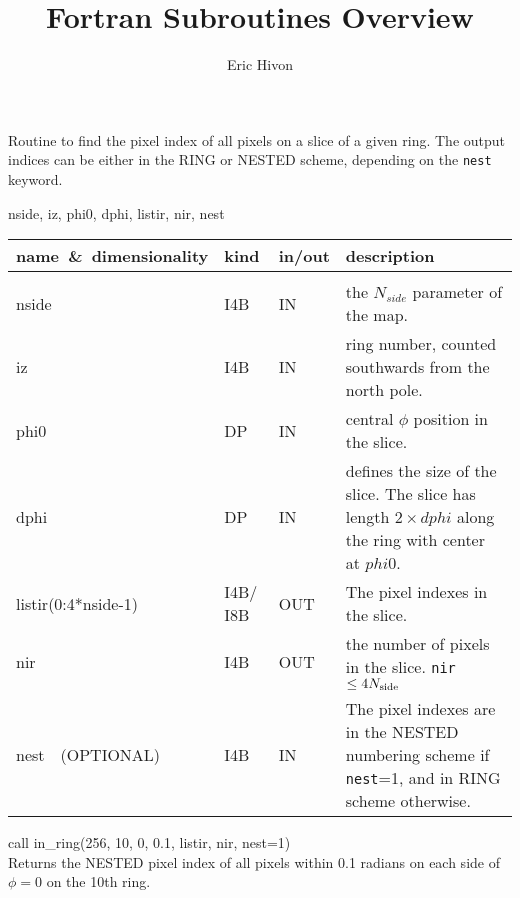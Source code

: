 
\sloppy


\title{\healpix Fortran Subroutines Overview}
 \section[in\_ring]{ }
\label{sub:in_ring}
\author{Eric Hivon}

\begin{facility}
{Routine to find the pixel index of all pixels on a slice of a given
ring. The output indices can be either in the RING or NESTED scheme,
depending on the {\tt nest} keyword.}
{\modPixTools}
\end{facility}

\begin{f90format}
{nside, iz, phi0, dphi, listir, nir, nest}
\end{f90format}

\begin{arguments}
{
\begin{tabular}{p{0.4\hsize} p{0.05\hsize} p{0.1\hsize} p{0.35\hsize}} \hline  
\textbf{name~\&~dimensionality} & \textbf{kind} & \textbf{in/out} & \textbf{description} \\ \hline
                   &   &   &                           \\ %
nside & I4B & IN & the $N_{side}$ parameter of the map. \\
iz & I4B & IN & ring number, counted southwards from the north pole. \\
phi0 & DP & IN & central $\phi$ position in the slice. \\
dphi & DP & IN & defines the size of the slice. The slice has length $2\times dphi$ along the ring with center at $phi0$. \\ 
listir(0:4*nside-1) & I4B/ I8B & OUT & The pixel indexes in the slice. \\
nir & I4B & OUT & the number of pixels in the slice. {\tt nir}$\le 4{N_{\rm side}}$\\
nest\ \ (OPTIONAL) & I4B & IN &  The pixel indexes are in the NESTED numbering
scheme if {\tt nest}=1, and in RING scheme otherwise. \\
\end{tabular}
}
\end{arguments}

\begin{example}
{
call in\_ring(256, 10, 0, 0.1, listir, nir, nest=1)  \\
}
{
Returns the NESTED pixel index of all pixels within 0.1 radians on each side of $\phi=0$ on the 10th ring.
}
\end{example}

